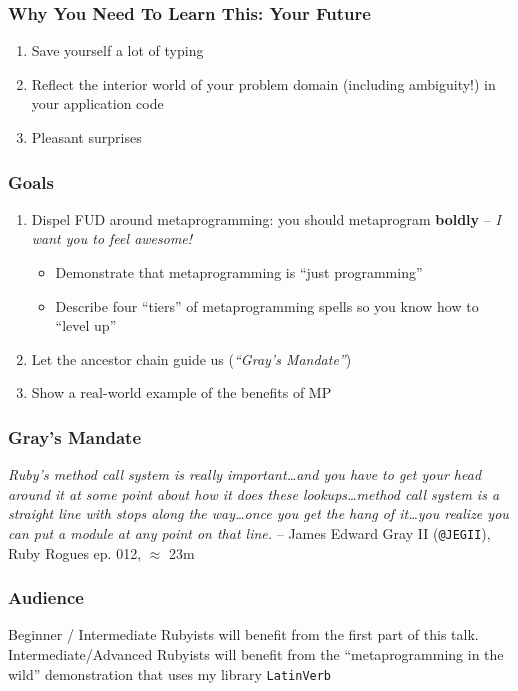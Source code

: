 \documentclass[slidestop,compress,mathserif]{beamer}
\begin{document}
\begin{frame}
	\frametitle{Why You Need To Learn This:  Your Future}
	\begin{enumerate}
		\item Save yourself a lot of typing
		\pause
		\item Reflect the interior world of your problem domain (including ambiguity!) in your application code
		\pause
		\item Pleasant surprises
	\end{enumerate}
\end{frame}

\begin{frame}
	\frametitle{Goals}
	\begin{enumerate}
		\item Dispel FUD around metaprogramming: you should metaprogram \textbf{boldly} -- \emph{I want you to feel awesome!}
		\pause
		\begin{itemize}
			\item Demonstrate that metaprogramming is ``just programming''
			\pause
			\item Describe four ``tiers'' of metaprogramming spells so you know how to ``level up''
		\end{itemize}
		\pause
		\item Let the ancestor chain guide us (\emph{``Gray's Mandate''})
		\pause
		\item Show a real-world example of the benefits of MP
	\end{enumerate}
\end{frame}

\begin{frame}
	\frametitle{Gray's Mandate}
	\begin{center}
		\emph{Ruby's method call system is really important{\ldots}and you have to get your
head around it at some point about how it does these lookups{\ldots}method call
system is a straight line with stops along the way…once you get the hang of
it{\ldots}you realize you can put a module at any point on that line.}
	-- James Edward Gray II (\texttt{@JEGII}), Ruby Rogues ep. 012, $\approx$ 23m
	\end{center}
\end{frame}

\begin{frame}
	\frametitle{Audience}
	Beginner / Intermediate Rubyists will benefit from the first part of this talk.
	\vskip 2.0cm
	Intermediate/Advanced Rubyists will benefit from the ``metaprogramming in the wild'' demonstration that uses my library \texttt{LatinVerb}
\end{frame}
\end{document}
